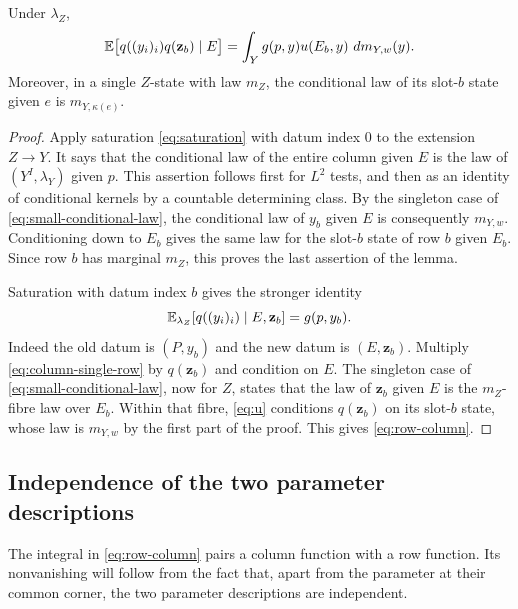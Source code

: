 

\begin{lemma}
\label{lem:row-column}
Under $\lambda_Z$,
\begin{equation}
 \mathbb E\big[q((y_i)_i)q(\mathbf z_b)\mid E\big]
   =\int_Y g(p,y)u(E_b,y)\,\,d m_{Y,w}(y).
 \label{eq:row-column}
\end{equation}
Moreover, in a single $Z$-state with law $m_Z$, the conditional law
of its slot-$b$ state given $e$ is $m_{Y,\kappa(e)}$.
\end{lemma}

\begin{proof}
Apply saturation \eqref{eq:saturation} with datum index $0$ to the
extension $Z\to Y$. It says that the conditional law of the entire
column given $E$ is the law of $(Y^I,\lambda_Y)$ given $p$.
This assertion follows first for $L^2$ tests, and then as an identity
of conditional kernels by a countable determining class. By the
singleton case of \eqref{eq:small-conditional-law}, the conditional
law of $y_b$ given $E$ is consequently $m_{Y,w}$. Conditioning down
to $E_b$ gives the same law for the slot-$b$ state of row $b$ given
$E_b$. Since row $b$ has marginal $m_Z$, this proves the last
assertion of the lemma.

Saturation with datum index $b$ gives the stronger identity
\begin{equation}
 \mathbb E_{\lambda_Z}[q((y_i)_i)\mid E,\mathbf z_b]=g(p,y_b).
 \label{eq:column-single-row}
\end{equation}
Indeed the old datum is $(P,y_b)$ and the new datum is
$(E,\mathbf z_b)$. Multiply \eqref{eq:column-single-row} by
$q(\mathbf z_b)$ and condition on $E$. The singleton case of
\eqref{eq:small-conditional-law}, now for $Z$, states that the law
of $\mathbf z_b$ given $E$ is the $m_Z$-fibre law over $E_b$.
Within that fibre, \eqref{eq:u} conditions $q(\mathbf z_b)$ on its
slot-$b$ state, whose law is $m_{Y,w}$ by the first part of the proof.
This gives \eqref{eq:row-column}.
\end{proof}

\subsection{Independence of the two parameter descriptions}

The integral in \eqref{eq:row-column} pairs a column function with
a row function. Its nonvanishing will follow from the fact that,
apart from the parameter at their common corner, the two parameter
descriptions are independent.

